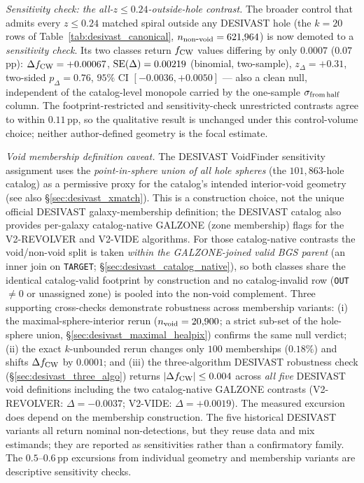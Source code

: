 \documentclass[twocolumn,linenumbers]{aastex702}
\begin{document}
\emph{Sensitivity check: the all-$z\le0.24$-outside-hole contrast.}
The broader control that admits every $z \le 0.24$ matched spiral
outside any DESIVAST hole (the $k=20$ rows of
Table~\ref{tab:desivast_canonical}, $n_{\rm non\mbox{-}void} =
621{,}964$) is now demoted to a \emph{sensitivity check}. Its two
classes return $f_{\rm CW}$ values differing by only $0.0007$
($0.07$\,pp): $\Delta f_{\rm CW} = +0.00067$, ${\rm SE}(\Delta) =
0.00219$ (binomial, two-sample), $z_\Delta = +0.31$, two-sided
$p_\Delta = 0.76$, $95\%$ CI $[-0.0036, +0.0050]$ --- also a clean null,
independent of the catalog-level monopole carried by the one-sample
$\sigma_{\rm from\,half}$ column. The footprint-restricted and
sensitivity-check unrestricted contrasts agree to within $0.11$\,pp,
so the qualitative result is unchanged under this control-volume
choice; neither author-defined geometry is the focal estimate.

\emph{Void membership definition caveat.}
The DESIVAST VoidFinder sensitivity assignment uses the
\emph{point-in-sphere union of all hole spheres} (the $101{,}863$-hole
catalog) as a permissive proxy for the catalog's intended interior-void
geometry (see also \S\ref{sec:desivast_xmatch}). This is a construction
choice, not the unique official DESIVAST galaxy-membership definition;
the DESIVAST catalog also provides per-galaxy catalog-native GALZONE
(zone membership) flags for the V2-REVOLVER and V2-VIDE algorithms.
For those catalog-native contrasts the void/non-void split is taken
\emph{within the GALZONE-joined valid BGS parent} (an inner join on
\texttt{TARGET}; \S\ref{sec:desivast_catalog_native}), so both classes
share the identical catalog-valid footprint by construction and no
catalog-invalid row (\texttt{OUT}$\neq0$ or unassigned zone) is pooled
into the non-void complement.
Three supporting cross-checks demonstrate robustness across membership
variants: (i) the maximal-sphere-interior rerun ($n_{\rm void} = 20{,}900$;
a strict sub-set of the hole-sphere union, \S\ref{sec:desivast_maximal_healpix})
confirms the same null verdict; (ii) the exact $k$-unbounded rerun
changes only $100$ memberships ($0.18\%$) and shifts $\Delta f_{\rm CW}$
by $0.0001$; and (iii) the three-algorithm DESIVAST robustness check
(\S\ref{sec:desivast_three_algo}) returns $|\Delta f_{\rm CW}| \le 0.004$
across \emph{all five} DESIVAST void definitions including the two
catalog-native GALZONE contrasts (V2-REVOLVER: $\Delta = -0.0037$;
V2-VIDE: $\Delta = +0.0019$). The measured excursion does depend on the
membership construction. The five historical DESIVAST variants all
return nominal non-detections, but they reuse data and mix estimands;
they are reported as sensitivities rather than a confirmatory family.
The $0.5$--$0.6$\,pp excursions from individual geometry and membership
variants are descriptive sensitivity checks.
\end{document}
